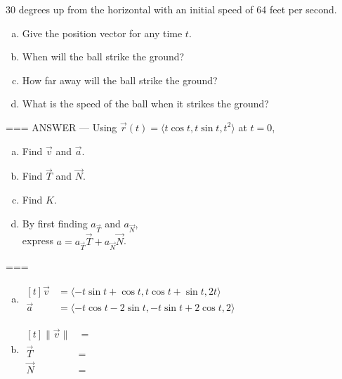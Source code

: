 30 degrees up from the horizontal with an initial speed of 64 feet per second.
\begin{enumerate}[a.]
  \item Give the position vector for any time \(t\).
  \item When will the ball strike the ground?
  \item How far away will the ball strike the ground?
  \item What is the speed of the ball when it strikes the ground?
\end{enumerate}
===
ANSWER
---
Using \(\vec r(t)=\langle t\cos t,t\sin t,t^2\rangle\) at \(t=0\),
\begin{enumerate}[a.]
  \item Find \(\vec v\) and \(\vec a\).
  \item Find \(\vec T\) and \(\vec N\).
  \item Find \(K\).
  \item By first finding \(a_{\vec T}\) and \(a_{\vec N}\),\\
    express \(a=a_{\vec T}\vec T+a_{\vec N}\vec N\).
\end{enumerate}
===
\begin{enumerate}[a.]
  \item
    \(\begin{aligned}[t]
      \vec v&=\langle-t\sin t+\cos t,t\cos t+\sin t,2t\rangle \\
      \vec a&=\langle-t\cos t-2\sin t,-t\sin t+2\cos t,2\rangle
    \end{aligned}\)
  \item
    \(\begin{aligned}[t]
      \|\vec v\|&=\frac{}{} \\
      \vec T&= \\
      \vec N&=
    \end{aligned}\)
\end{enumerate}
